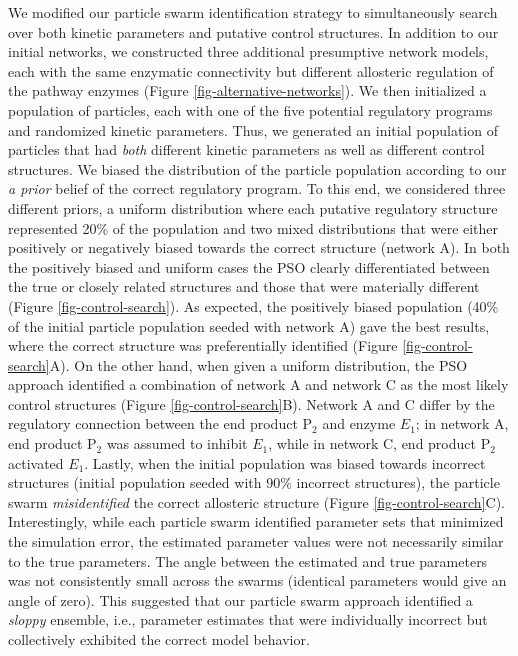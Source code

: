 \documentclass[processes,article,accept,moreauthors,pdftex,12pt,a4paper]{mdpi}
\begin{document}
We modified our particle swarm identification strategy to simultaneously search over both kinetic parameters and putative control structures. 
In addition to our initial networks, we constructed three additional presumptive network models, each with the same enzymatic connectivity but different allosteric regulation of the pathway enzymes (Figure \ref{fig-alternative-networks}). 
We then initialized a population of particles, each with one of the five potential regulatory programs and randomized kinetic parameters. 
Thus, we generated an initial population of particles that had \textit{both} different kinetic parameters as well as different control structures. 
We biased the distribution of the particle population according to our \textit{a prior} belief of the correct regulatory program. 
To this end, we considered three different priors, a uniform distribution where each putative regulatory structure represented 20\% of the population and two mixed distributions that were either positively or negatively biased towards the correct structure (network A). 
In both the positively biased and uniform cases the PSO clearly differentiated between the true or closely related structures and those that were materially different (Figure \ref{fig-control-search}). 
As expected, the positively biased population (40\% of the initial particle population seeded with network A) gave the best results, where the correct structure was preferentially identified (Figure \ref{fig-control-search}A). 
On the other hand, when given a uniform distribution, the PSO approach identified a combination of network A and network C as the most likely control structures (Figure \ref{fig-control-search}B). 
Network A and C differ by the regulatory connection between the end product P$_2$ and enzyme $E_{1}$; in network A, end product P$_{2}$ was assumed to inhibit $E_{1}$, while in network C, end product P$_{2}$ activated $E_{1}$.  
Lastly, when the initial population was biased towards incorrect structures (initial population seeded with 90\% incorrect structures), the particle swarm \textit{misidentified} the correct allosteric structure (Figure \ref{fig-control-search}C). 
Interestingly, while each particle swarm identified parameter sets that minimized the simulation error, the estimated parameter values were not necessarily similar to the true parameters. 
The angle between the estimated and true parameters was not consistently small across the swarms (identical parameters would give an angle of zero). 
This suggested that our particle swarm approach identified a \textit{sloppy} ensemble, i.e., parameter estimates that were individually incorrect but collectively exhibited the correct model behavior.  
\end{document}

